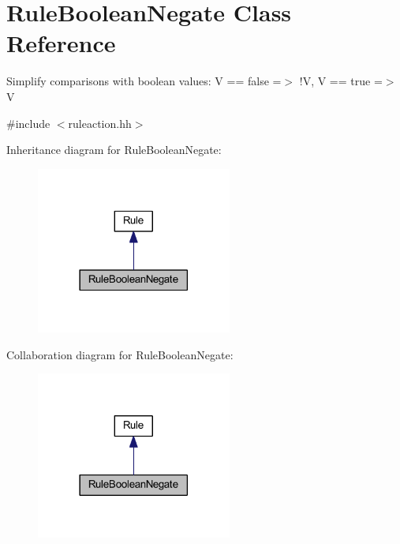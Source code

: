\hypertarget{class_rule_boolean_negate}{}\section{Rule\+Boolean\+Negate Class Reference}
\label{class_rule_boolean_negate}


Simplify comparisons with boolean values\+: {\ttfamily V == false =$>$ !V, V == true =$>$ V}  




{\ttfamily \#include $<$ruleaction.\+hh$>$}



Inheritance diagram for Rule\+Boolean\+Negate\+:
\nopagebreak
\begin{figure}[H]
\begin{center}
\leavevmode
\includegraphics[width=182pt]{class_rule_boolean_negate__inherit__graph}
\end{center}
\end{figure}


Collaboration diagram for Rule\+Boolean\+Negate\+:
\nopagebreak
\begin{figure}[H]
\begin{center}
\leavevmode
\includegraphics[width=182pt]{class_rule_boolean_negate__coll__graph}
\end{center}
\end{figure}
